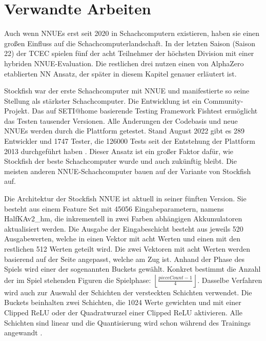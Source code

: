 \chapter{Verwandte Arbeiten}
\label{chap:relatedWork}

Auch wenn \acp{NNUE} erst seit 2020 in Schachcomputern existieren, haben sie einen großen Einfluss auf die Schachcomputerlandschaft. In der letzten Saison (Saison 22) der \ac{TCEC} \cite{TCEC22} spielen fünf der acht Teilnehmer der höchsten Division mit einer hybriden \ac{NNUE}-Evaluation. Die restlichen drei nutzen einen von AlphaZero etablierten \ac{NN} Ansatz, der später in diesem Kapitel genauer erläutert ist.


Stockfish war der erste Schachcomputer mit \ac{NNUE} und manifestierte so seine Stellung als stärkster Schachcomputer. Die Entwicklung ist ein Community-Projekt. Das auf SETI@home \cite{SETI2001} basierende Testing Framework Fishtest ermöglicht das Testen tausender Versionen. Alle Änderungen der Codebasis und neue \acp{NNUE} werden durch die Plattform getestet. Stand August 2022 gibt es 289 Entwickler und 1747 Tester, die 126000 Tests seit der Entstehung der Plattform 2013 durchgeführt haben \cite{FishtestUsers}. Dieser Ansatz ist ein großer Faktor dafür, wie Stockfish der beste Schachcomputer wurde und auch zukünftig bleibt. Die meisten anderen \ac{NNUE}-Schachcomputer bauen auf der Variante von Stockfish auf.
 
Die Architektur der Stockfish \ac{NNUE} ist aktuell in seiner fünften Version. Sie besteht aus einem Feature Set mit 45056 Eingabeparametern, namens HalfKAv2\_hm, die inkrementell in zwei Farben abhängigen Akkumulatoren aktualisiert werden. Die Ausgabe der Eingabeschicht besteht aus jeweils 520 Ausgabewerten, welche in einen Vektor mit acht Werten und einen mit den restlichen 512 Werten geteilt wird. Die zwei Vektoren mit acht Werten werden basierend auf der Seite angepasst, welche am Zug ist. Anhand der Phase des Spiels wird einer der sogenannten Buckets gewählt. Konkret bestimmt die Anzahl der im Spiel stehenden Figuren die Spielphase: $\left \lfloor\frac{pieceCount-1}{4}\right \rfloor$. Dasselbe Verfahren wird auch zur Auswahl der Schichten der versteckten Schichten verwendet. Die Buckets beinhalten zwei Schichten, die 1024 Werte gewichten und mit einer Clipped \ac{ReLU} oder der Quadratwurzel einer Clipped \ac{ReLU} aktivieren. Alle Schichten sind linear und die Quantisierung wird schon während des Trainings angewandt \cite{StockfishNNUE}.

